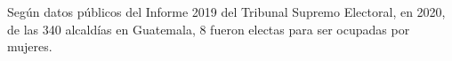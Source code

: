 Según datos públicos del Informe 2019 del Tribunal Supremo Electoral, en 2020, de las 340 alcaldías en Guatemala, 8 fueron electas para ser ocupadas por mujeres. 